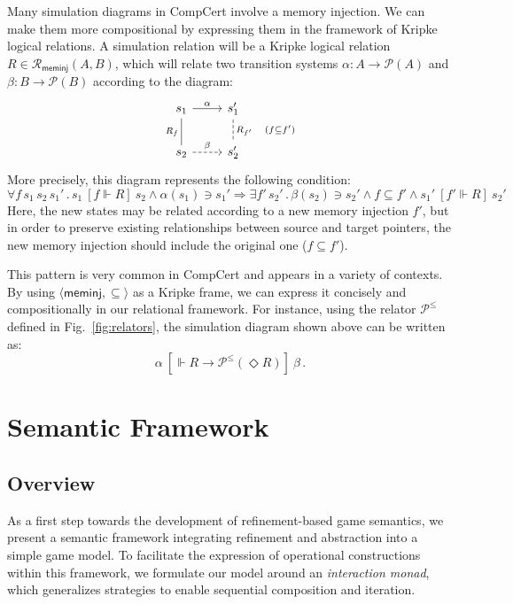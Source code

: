 \documentclass[acmsmall,timestamp,review,anonymous]{acmart}
\newcommand{\kw}[1]{\ensuremath{ \mathsf{#1} }}
\newcommand{\ifr}[1]{\ [{#1}]\ }
\begin{document}
\begin{example} \label{ex:sim} %
Many simulation diagrams in CompCert
involve a memory injection.
We can make them more compositional by
expressing them in the framework of Kripke logical relations.
A simulation relation will be a Kripke logical relation
$R \in \mathcal{R}_\kw{meminj}(A, B)$,
which will relate two transition systems
$\alpha : A \rightarrow \mathcal{P}(A)$ and
$\beta : B \rightarrow \mathcal{P}(B)$
according to the diagram:
\[
  \begin{tikzcd}
    s_1 \arrow[r, "\alpha"]
        \arrow[d, dash, "R_f"'] &
    s_1' \arrow[d, dashed, dash, "R_{f'} \quad (f \subseteq f')"] \\
    s_2 \arrow[r, dashed, "\beta"] &
    s_2'
  \end{tikzcd}
\]
More precisely, this diagram represents the following condition:
\[
    \forall f \, s_1 \, s_2 \, s_1' \,.\,
      s_1 \ifr{f \Vdash R} s_2 \wedge
      \alpha(s_1) \ni s_1' \Rightarrow
    \exists f' \, s_2' \,.\,
      \beta(s_2) \ni s_2' \wedge
      f \subseteq f' \wedge
      s_1' \ifr{f' \Vdash R} s_2'
\]
Here, the new states may be related according to
a new memory injection $f'$,
but in order to preserve existing relationships
between source and target pointers,
the new memory injection should include
the original one ($f \subseteq f'$).

This pattern is very common in CompCert
and appears in a variety of contexts.
By using $\langle \kw{meminj}, {\subseteq} \rangle$
as a Kripke frame,
we can express it concisely and compositionally
in our relational framework.
For instance,
using the relator $\mathcal{P}^\le$ defined in
Fig.~\ref{fig:relators},
the simulation diagram shown above can be written as:
\[
  \alpha \ifr{\Vdash R \rightarrow \mathcal{P}^\le(\Diamond R)} \beta \,.
\]
\end{example}



\section{Semantic Framework} \label{sec:monad} %

\subsection{Overview} %

As a first step towards
the development of refinement-based game semantics,
we present a semantic framework
integrating refinement and abstraction
into a simple game model.
To facilitate the expression of operational constructions
within this framework,
we formulate our model around an \emph{interaction monad},
which generalizes strategies to enable
sequential composition and iteration.
\end{document}
